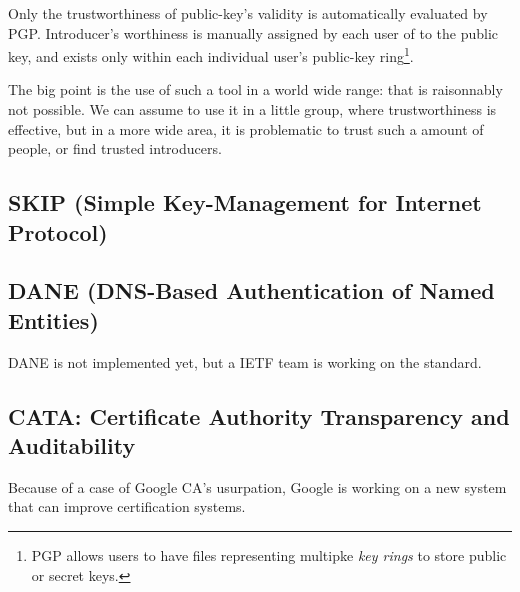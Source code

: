 \documentclass[journal, a4paper]{IEEEtran}
\begin{document}
Only the trustworthiness of public-key's validity is automatically evaluated by PGP. Introducer's worthiness is manually assigned by each user of to the public key, and exists only within each individual user's public-key ring\footnote{PGP allows users to have files representing multipke \textit{key rings} to store public or secret keys\cite{caronni2000}.}.

The big point is the use of such a tool in a world wide range: that is raisonnably not possible. We can assume to use it in a little group, where trustworthiness is effective, but in a more wide area, it is problematic to trust such a amount of people, or find trusted introducers.


\subsection{SKIP (Simple Key-Management for Internet Protocol)}
\label{skip}



\subsection{DANE (DNS-Based Authentication of Named Entities)}
\label{dane}

DANE is not implemented yet, but a IETF team is working on the standard.

\subsection{CATA: Certificate Authority Transparency and Auditability}
\label{certtrans}

Because of a case of Google CA's usurpation, Google is working on a new system that can improve certification systems.

\nocite{*}
\end{document}
